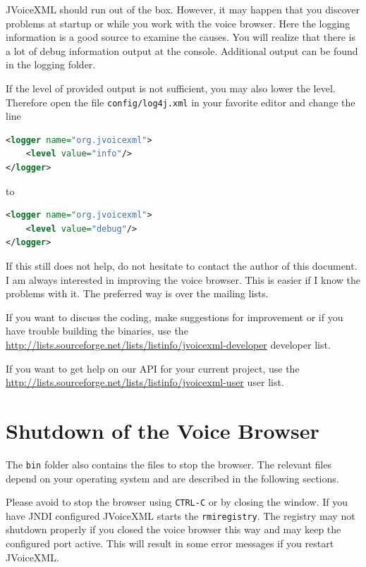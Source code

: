 \documentclass[11pt,a4paper]{book}
\begin{document}
JVoiceXML should run out of the box. However, it may happen that you discover
problems at startup or while you work with the voice browser. Here the logging
information is a good source to examine the causes. You will realize that there
is a lot of debug information output at the console. Additional output can be
found in the logging folder.

If the level of provided output is not sufficient, you may also lower the level.
Therefore open the file \lstinline{config/log4j.xml} in your favorite editor
and change the line

\begin{lstlisting}[language=XML]
<logger name="org.jvoicexml">
    <level value="info"/>
</logger>
\end{lstlisting}

to

\begin{lstlisting}[language=XML]
<logger name="org.jvoicexml">
    <level value="debug"/>
</logger>
\end{lstlisting}

If this still does not help, do not hesitate to contact the author of this
document. I am always interested in improving the voice browser. This is
easier if I know the problems with it. The preferred way is over the mailing
lists.

If you want to discuss the coding, make suggestions for improvement or if
you have trouble building the binaries, use the
\url{http://lists.sourceforge.net/lists/listinfo/jvoicexml-developer}
developer list.

If you want to get help on our API for your current project, use the
\url{http://lists.sourceforge.net/lists/listinfo/jvoicexml-user} user list.

\section{Shutdown of the Voice Browser}

The \texttt{bin} folder also contains the files to stop the browser. The
relevant files depend on your operating system and are described in the following
sections.

Please avoid to stop the browser using \lstinline{CTRL-C} or by closing the
window. If you have JNDI configured JVoiceXML starts the \lstinline{rmiregistry}.
The registry may not shutdown properly if you closed the voice browser this way
and may keep the configured port active. This will result in some error messages
if you restart JVoiceXML.
\end{document}
